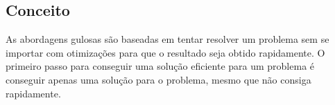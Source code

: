 \subsection*{Conceito}

As abordagens gulosas são baseadas em tentar resolver um problema sem 
se importar com otimizações para que o resultado seja obtido rapidamente.
O primeiro passo para conseguir uma solução eficiente para um problema é
conseguir apenas uma solução para o problema, mesmo que não consiga 
rapidamente.